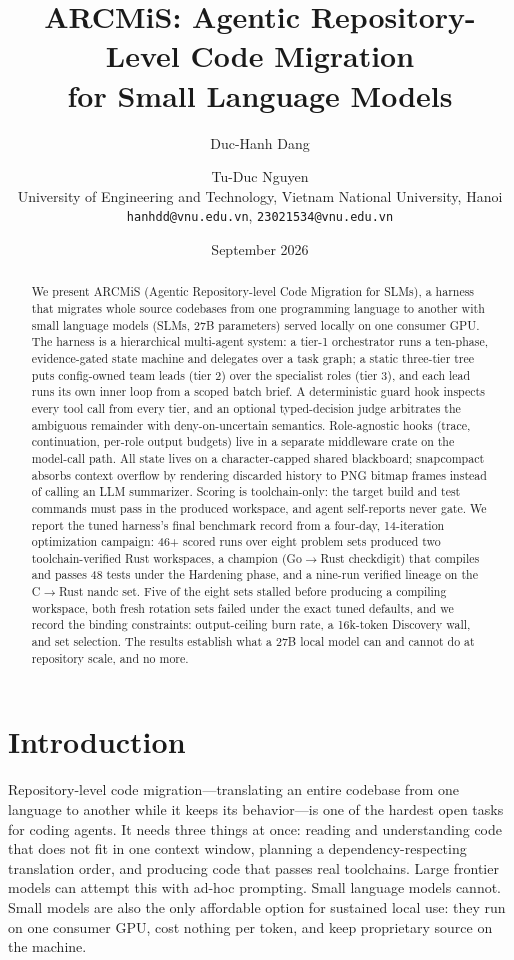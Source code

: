 \documentclass[11pt]{article}
\title{ARCMiS: Agentic Repository-Level Code Migration\\for Small Language Models}
\author{Duc-Hanh Dang \and Tu-Duc Nguyen\\
University of Engineering and Technology, Vietnam National University, Hanoi\\
\texttt{hanhdd@vnu.edu.vn}, \texttt{23021534@vnu.edu.vn}}
\date{September 2026}
\begin{document}
\maketitle

\begin{abstract}
We present ARCMiS (Agentic Repository-level Code Migration for SLMs), a
harness that migrates whole source codebases from one programming language
to another with small language models (SLMs, 27B parameters) served
locally on one consumer GPU. The harness is a hierarchical multi-agent
system: a tier-1 orchestrator runs a ten-phase, evidence-gated state
machine and delegates over a task graph; a static three-tier tree puts
config-owned team leads (tier 2) over the specialist roles (tier 3), and
each lead runs its own inner loop from a scoped batch brief. A
deterministic guard hook inspects every tool call from every
tier, and an optional typed-decision judge arbitrates the ambiguous
remainder with deny-on-uncertain semantics. Role-agnostic hooks (trace,
continuation, per-role output budgets) live in a separate middleware
crate on the model-call path. All state lives on a
character-capped shared blackboard; snapcompact absorbs context overflow
by rendering discarded history to PNG bitmap frames instead of calling an
LLM summarizer. Scoring is toolchain-only: the target build and test
commands must pass in the produced workspace, and agent self-reports
never gate. We report the tuned harness's final benchmark record from a
four-day, 14-iteration optimization campaign: 46+ scored runs over eight
problem sets produced two toolchain-verified Rust workspaces, a champion
(Go$\to$Rust checkdigit) that compiles and passes 48 tests under the
\textsf{Hardening} phase, and a nine-run verified lineage on the
C$\to$Rust nandc set. Five of the eight sets stalled before producing a
compiling workspace, both fresh rotation sets failed under the exact
tuned defaults, and we record the binding constraints: output-ceiling
burn rate, a 16k-token Discovery wall, and set selection. The results
establish what a 27B local model can and cannot do at repository scale,
and no more.
\end{abstract}

\section{Introduction}
\label{sec:intro}

Repository-level code migration---translating an entire codebase from one
language to another while it keeps its behavior---is one of the hardest
open tasks for coding agents. It needs three things at once: reading and
understanding code that does not fit in one context window, planning a
dependency-respecting translation order, and producing code that passes
real toolchains. Large frontier models can attempt this with ad-hoc
prompting. Small language models cannot. Small models are also the only
affordable option for sustained local use: they run on one consumer GPU,
cost nothing per token, and keep proprietary source on the machine.
\end{document}

